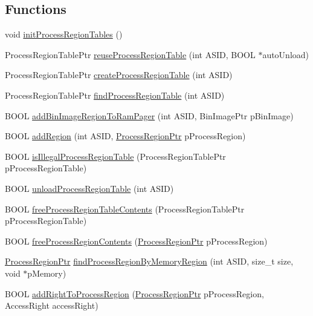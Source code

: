 \subsection*{Functions}
\begin{CompactItemize}
\item 
void \hyperlink{group___v_m_m___p_r_t_g77b59cf14a5524b6cf3ad0455c15b8bb}{initProcessRegionTables} ()
\item 
ProcessRegionTablePtr \hyperlink{group___v_m_m___p_r_t_g296088b63a558cf3d38b438dddfd4f06}{reuseProcessRegionTable} (int ASID, BOOL $\ast$autoUnload)
\item 
ProcessRegionTablePtr \hyperlink{group___v_m_m___p_r_t_gfb393f1640529f598296f3b4ecee0874}{createProcessRegionTable} (int ASID)
\item 
ProcessRegionTablePtr \hyperlink{group___v_m_m___p_r_t_g1a235146354b478aebb943e89d11ebb7}{findProcessRegionTable} (int ASID)
\item 
BOOL \hyperlink{group___v_m_m___p_r_t_g9a1a7531051937bcea7f8f373cd5e622}{addBinImageRegionToRamPager} (int ASID, BinImagePtr pBinImage)
\item 
BOOL \hyperlink{group___v_m_m___p_r_t_g518e4adc2150f04b43eade644523eec7}{addRegion} (int ASID, \hyperlink{struct_process_region}{ProcessRegionPtr} pProcessRegion)
\item 
BOOL \hyperlink{group___v_m_m___p_r_t_ga71999d60ed6ffd380de19b82064e115}{isIllegalProcessRegionTable} (ProcessRegionTablePtr pProcessRegionTable)
\item 
BOOL \hyperlink{group___v_m_m___p_r_t_g3005fc0af040931da544c349f3f3997b}{unloadProcessRegionTable} (int ASID)
\item 
BOOL \hyperlink{group___v_m_m___p_r_t_g5b19ce07f679920b8eeb08bfe28b37de}{freeProcessRegionTableContents} (ProcessRegionTablePtr pProcessRegionTable)
\item 
BOOL \hyperlink{group___v_m_m___p_r_t_gd3367b77c8075f072fd9cbdcce6ed3c8}{freeProcessRegionContents} (\hyperlink{struct_process_region}{ProcessRegionPtr} pProcessRegion)
\item 
\hyperlink{struct_process_region}{ProcessRegionPtr} \hyperlink{group___v_m_m___p_r_t_gb544170401f25a8d8400c426ccbf157c}{findProcessRegionByMemoryRegion} (int ASID, size\_\-t size, void $\ast$pMemory)
\item 
BOOL \hyperlink{group___v_m_m___p_r_t_g729d2fee9d5aac1f889e6ecae833dd1b}{addRightToProcessRegion} (\hyperlink{struct_process_region}{ProcessRegionPtr} pProcessRegion, AccessRight accessRight)
\end{CompactItemize}

